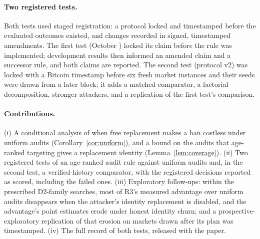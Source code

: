 \documentclass[11pt]{article}
\begin{document}
\paragraph{Two registered tests.} Both tests used staged registration: a protocol locked and timestamped before the evaluated outcomes existed, and changes recorded in signed, timestamped amendments. The first test (October ) locked its claim before the rule was implemented; development results then informed an amended claim and a successor rule, and both claims are reported. The second test (protocol v2) was locked with a Bitcoin timestamp before six fresh market instances and their seeds were drawn from a later block; it adds a matched comparator, a factorial decomposition, stronger attackers, and a replication of the first test's comparison.

\paragraph{Contributions.} (i) A conditional analysis of when free replacement makes a ban costless under uniform audits (Corollary~\ref{cor:uniform}), and a bound on the audits that age-ranked targeting gives a replacement identity (Lemma~\ref{lem:coverage}). (ii) Two registered tests of an age-ranked audit rule against uniform audits and, in the second test, a verified-history comparator, with the registered decisions reported as scored, including the failed ones. (iii) Exploratory follow-ups: within the prescribed D2-family searches, most of R3's measured advantage over uniform audits disappears when the attacker's identity replacement is disabled, and the advantage's point estimates erode under honest identity churn; and a prospective-exploratory replication of that erosion on markets drawn after its plan was timestamped. (iv) The full record of both tests, released with the paper.
\end{document}
